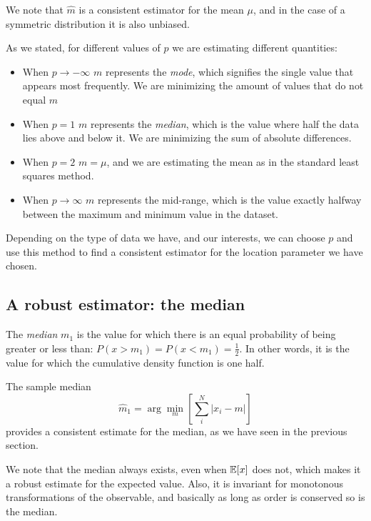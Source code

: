 We note that $\hat{m}$ is a consistent estimator for the mean $\mu$, and in the case of a symmetric distribution it is also unbiased.

As we stated, for different values of $p$ we are estimating different quantities:
\begin{itemize}
	\item When $p\rightarrow-\infty$ $m$ represents the \emph{mode}, which signifies the single value that appears most frequently. We are minimizing the amount of values that do not equal $m$
	\item When $p=1$ $m$ represents the \emph{median}, which is the value where half the data lies above and below it. We are minimizing the sum of absolute differences.
	\item When $p=2$ $m=\mu$, and we are estimating the mean as in the standard least squares method. 
	\item When $p\rightarrow\infty$ $m$ represents the mid-range, which is the value exactly halfway between the maximum and minimum value in the dataset.
\end{itemize}

Depending on the type of data we have, and our interests, we can choose $p$ and use this method to find a consistent estimator for the location parameter we have chosen.

\subsection{A robust estimator: the median}
\begin{definition}[Median]
	The \emph{median} $m_1$ is the value for which there is an equal probability of being greater or less than: $P(x > m_1) = P(x<m_1) = \frac{1}{2}$. In other words, it is the value for which the cumulative density function is one half. 
\end{definition}

The sample median 
	\[
	\hat{m}_1 = \arg\min_m\left[\sum_i^N\left|x_i-m\right|\right]
	\]
provides a consistent estimate for the median, as we have seen in the previous section.

We note that the median always exists, even when $\mathbb{E}[x]$ does not, which makes it a robust estimate for the expected value. Also, it is invariant for monotonous transformations of the observable, and basically as long as order is conserved so is the median. 


